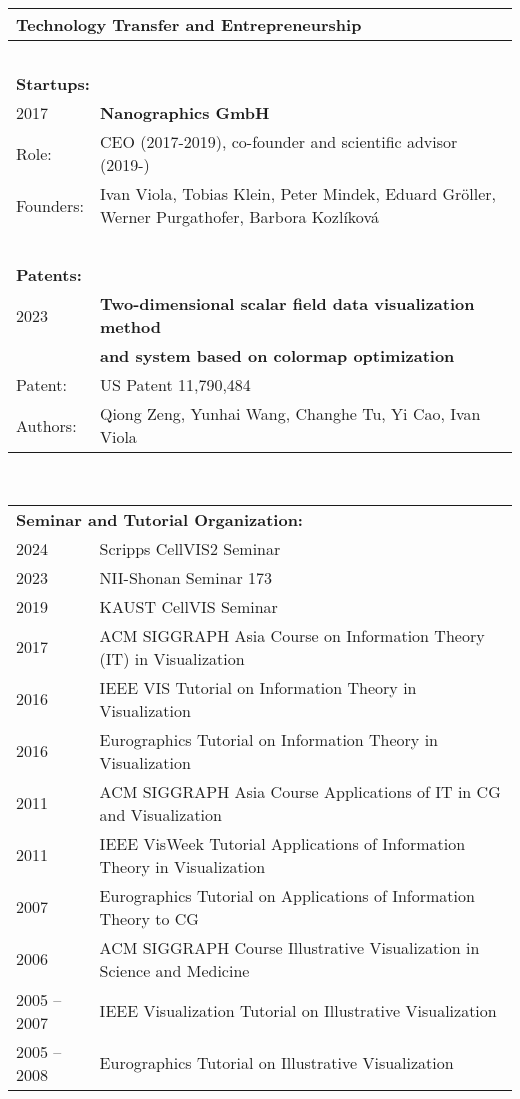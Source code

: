 \documentclass[a4paper,11pt]{letter}
\begin{document}
\begin{tabular}{l| l}
\multicolumn{2}{l}{\textbf{Technology Transfer and Entrepreneurship}} \\
\hline
\multicolumn{2}{l}{\textbf{~}} \\
\multicolumn{2}{l}{\textbf{Startups:}} \\
2017 & \textbf{Nanographics GmbH}\\
Role: & CEO (2017-2019), co-founder and scientific advisor (2019-)\\
Founders: & Ivan Viola, Tobias Klein, Peter Mindek, Eduard Gr{\"o}ller, Werner Purgathofer, Barbora Kozl{\'i}kov{\'a}\\
\hline
\multicolumn{2}{l}{\textbf{~}} \\
\multicolumn{2}{l}{\textbf{Patents:}} \\
2023 & \textbf{Two-dimensional scalar field data visualization method}\\
 & \textbf{and system based on colormap optimization}\\
Patent: & US Patent 11,790,484\\
Authors: & Qiong Zeng, Yunhai Wang, Changhe Tu, Yi Cao, Ivan Viola\\
\hline
\end{tabular}

~\\

\begin{tabular}{l| l}
\multicolumn{2}{l}{\textbf{Seminar and Tutorial Organization:}} \\
2024 & Scripps CellVIS2 Seminar \\
2023 & NII-Shonan Seminar 173 \\
2019 & KAUST CellVIS Seminar \\
2017 & ACM SIGGRAPH Asia Course on Information Theory (IT) in Visualization \\
2016 & IEEE VIS Tutorial on Information Theory in Visualization \\
2016 & Eurographics Tutorial on Information Theory in Visualization \\
2011 & ACM SIGGRAPH Asia Course Applications of IT in CG and Visualization \\
2011 & IEEE VisWeek Tutorial Applications of Information Theory in Visualization \\
2007 & Eurographics Tutorial on Applications of Information Theory to CG \\
2006 & ACM SIGGRAPH Course Illustrative Visualization in Science and Medicine \\
2005 -- 2007 & IEEE Visualization Tutorial on Illustrative Visualization \\
2005 -- 2008 & Eurographics Tutorial on Illustrative Visualization \\
\hline
\end{tabular}
\end{document}
